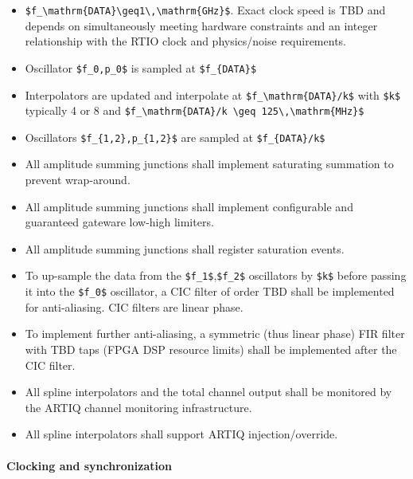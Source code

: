 \begin{itemize}
	\item
	\texttt{\$f\_\textbackslash{}mathrm\{DATA\}\textbackslash{}geq1\textbackslash{},\textbackslash{}mathrm\{GHz\}\$}.
	Exact clock speed is TBD and depends on simultaneously meeting
	hardware constraints and an integer relationship with the RTIO clock
	and physics/noise requirements.
	\item
	Oscillator \texttt{\$f\_0,p\_0\$} is sampled at
	\texttt{\$f\_\{DATA\}\$}
	\item
	Interpolators are updated and interpolate at
	\texttt{\$f\_\textbackslash{}mathrm\{DATA\}/k\$} with \texttt{\$k\$}
	typically 4 or 8 and
	\texttt{\$f\_\textbackslash{}mathrm\{DATA\}/k\ \textbackslash{}geq\ 125\textbackslash{},\textbackslash{}mathrm\{MHz\}\$}
	\item
	Oscillators \texttt{\$f\_\{1,2\},p\_\{1,2\}\$} are sampled at
	\texttt{\$f\_\{DATA\}/k\$}
	\item
	All amplitude summing junctions shall implement saturating summation
	to prevent wrap-around.
	\item
	All amplitude summing junctions shall implement configurable and
	guaranteed gateware low-high limiters.
	\item
	All amplitude summing junctions shall register saturation events.
	\item
	To up-sample the data from the \texttt{\$f\_1\$},\texttt{\$f\_2\$}
	oscillators by \texttt{\$k\$} before passing it into the
	\texttt{\$f\_0\$} oscillator, a CIC filter of order TBD shall be
	implemented for anti-aliasing. CIC filters are linear phase.
	\item
	To implement further anti-aliasing, a symmetric (thus linear phase)
	FIR filter with TBD taps (FPGA DSP resource limits) shall be
	implemented after the CIC filter.
	\item
	All spline interpolators and the total channel output shall be
	monitored by the ARTIQ channel monitoring infrastructure.
	\item
	All spline interpolators shall support ARTIQ injection/override.
\end{itemize}

\paragraph{Clocking and
	synchronization}\label{clocking-and-synchronization}

